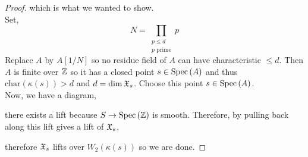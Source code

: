 \documentclass[12pt]{article}
\begin{document}
\begin{proof}
which is what we wanted to show.
\bigskip\\
Set,
\[ N = \prod_{\substack{p \le d \\ p \text{ prime}}} p \]
Replace $A$ by $A[1/N]$ so no residue field of $A$ can have characteristic $\le d$. Then $A$ is finite over $\mathbb{Z}$ so it has a closed point $s \in \mathrm{Spec}\left( A \right)$ and thus $\mathrm{char}(\kappa(s)) > d$ and $d = \dim{\mathfrak{X}_s}$. Choose this point $s \in \mathrm{Spec}\left( A \right)$.
\bigskip\\
Now, we have a diagram,
\begin{center}
\end{center}
there exists a lift because $S \to \mathrm{Spec}\left( \mathbb{Z} \right)$ is smooth. Therefore, by pulling back along this lift gives a lift of $\mathfrak{X}_s$,
\begin{center}
\end{center}
therefore $\mathfrak{X}_s$ lifts over $W_2(\kappa(s))$ so we are done.
\end{proof}
\end{document}
